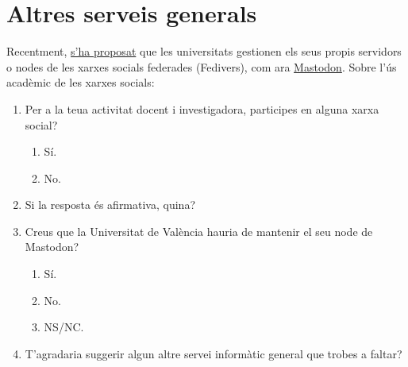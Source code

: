 \documentclass[a4paper,12pt]{article}
\begin{document}
\section{Altres serveis generals}
Recentment, \href{https://netzpolitik.org/2023/a-call-to-action-universities-of-the-world-into-the-fediverse/#!}{s'ha proposat}
que les universitats gestionen els seus propis servidors o nodes de les xarxes socials federades (Fedivers), com ara
\href{https://doi.org/10.1038/d41586-023-00486-3}{Mastodon}. Sobre l'ús acadèmic de les xarxes socials:
\begin{enumerate}
\item Per a la teua activitat docent i investigadora, participes en alguna xarxa social?
   \begin{enumerate}
   \item Sí.
   \item No.
   \end{enumerate}
\item Si la resposta és afirmativa, quina?
\item Creus que la Universitat de València hauria de mantenir el seu node de Mastodon?
   \begin{enumerate}
   \item Sí.
   \item No.
   \item NS/NC.
   \end{enumerate}

\item T'agradaria suggerir algun altre servei informàtic general que trobes a faltar?
\end{enumerate}
\end{document}
